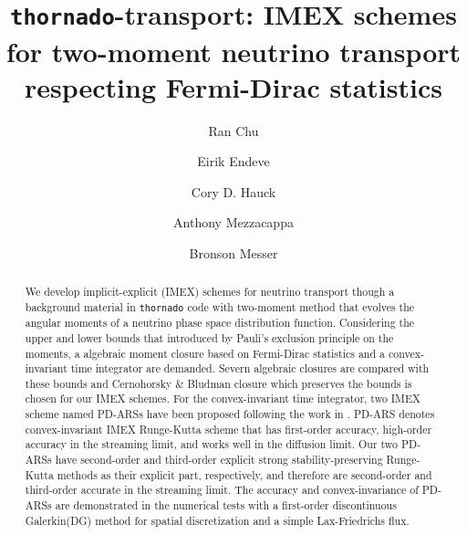 \documentclass[a4paper]{jpconf}
\begin{document}
\title{\texttt{thornado}-transport: IMEX schemes for two-moment neutrino transport respecting Fermi-Dirac statistics}

\author{Ran Chu}
\address{Department of Physics and Astronomy, University of Tennessee Knoxville, TN 37996-1200}

\author{Eirik Endeve}
\address{Computational and Applied Mathematics Group, Oak Ridge National Laboratory, Oak Ridge, TN 37831 USA}
\address{Department of Physics and Astronomy, University of Tennessee Knoxville, TN 37996-1200}

\author{Cory D. Hauck}
\address{Computational and Applied Mathematics Group, Oak Ridge National Laboratory, Oak Ridge, TN 37831 USA}
\address{Department of Mathematics, University of Tennessee Knoxville, TN 37996-1320}

\author{Anthony Mezzacappa}
\address{Department of Physics and Astronomy, University of Tennessee Knoxville, TN 37996-1200}

\author{Bronson Messer}
\address{Scientific Computing and Theoretical Physics Groups, Oak Ridge National Laboratory, Oak Ridge, TN 37831 USA}
\address{Department of Physics and Astronomy, University of Tennessee Knoxville, TN 37996-1200}

\begin{abstract}
We develop implicit-explicit (IMEX) schemes for neutrino transport though a background material in \texttt{thornado} code with two-moment method that evolves the angular moments of a neutrino phase space distribution function.
Considering the upper and lower bounds that introduced by Pauli's exclusion principle on the moments, a algebraic moment closure based on Fermi-Dirac statistics and a convex-invariant time integrator are demanded.
Severn algebraic closures are compared with these bounds and Cernohorsky \& Bludman closure\cite{cernohorskyBludman_1994} which preserves the bounds is chosen for our IMEX schemes.
For the convex-invariant time integrator, two IMEX scheme named PD-ARSs have been proposed following the work in \cite{chu_etal_2018}.
PD-ARS denotes convex-invariant IMEX Runge-Kutta scheme that has first-order accuracy, high-order accuracy in the streaming limit, and works well in the diffusion limit.
Our two PD-ARSs have second-order and third-order explicit strong stability-preserving Runge-Kutta methods\cite{gottlieb_etal_2001} as their explicit part, respectively, and therefore are second-order and third-order accurate in the streaming limit.
The accuracy and convex-invariance of PD-ARSs are demonstrated in the numerical tests with a first-order discontinuous Galerkin(DG) method for spatial discretization and a simple Lax-Friedrichs flux.

\end{abstract}










\end{document}
